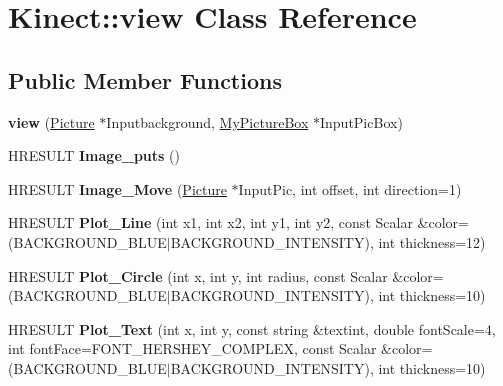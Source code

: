 \hypertarget{class_kinect_1_1view}{}\section{Kinect\+:\+:view Class Reference}
\label{class_kinect_1_1view}
\subsection*{Public Member Functions}
\begin{DoxyCompactItemize}
\item 
\mbox{\label{class_kinect_1_1view_a7ebf6fadb413105fa01bcead12b0359b}} 
{\bfseries view} (\hyperlink{class_kinect_1_1_picture}{Picture} $\ast$Inputbackground, \hyperlink{class_kinect_1_1_my_picture_box}{My\+Picture\+Box} $\ast$Input\+Pic\+Box)
\item 
\mbox{\label{class_kinect_1_1view_ac92e473babcc53663eff1f24bc9aa220}} 
H\+R\+E\+S\+U\+LT {\bfseries Image\+\_\+puts} ()
\item 
\mbox{\label{class_kinect_1_1view_aad987f15fb3002d68f8ff03bb84b119a}} 
H\+R\+E\+S\+U\+LT {\bfseries Image\+\_\+\+Move} (\hyperlink{class_kinect_1_1_picture}{Picture} $\ast$Input\+Pic, int offset, int direction=1)
\item 
\mbox{\label{class_kinect_1_1view_a60be597e91bc28f18d1806beb2edba81}} 
H\+R\+E\+S\+U\+LT {\bfseries Plot\+\_\+\+Line} (int x1, int x2, int y1, int y2, const Scalar \&color=(B\+A\+C\+K\+G\+R\+O\+U\+N\+D\+\_\+\+B\+L\+UE$\vert$B\+A\+C\+K\+G\+R\+O\+U\+N\+D\+\_\+\+I\+N\+T\+E\+N\+S\+I\+TY), int thickness=12)
\item 
\mbox{\label{class_kinect_1_1view_afef3fd27b92b0de9152aa3f2372c4e0f}} 
H\+R\+E\+S\+U\+LT {\bfseries Plot\+\_\+\+Circle} (int x, int y, int radius, const Scalar \&color=(B\+A\+C\+K\+G\+R\+O\+U\+N\+D\+\_\+\+B\+L\+UE$\vert$B\+A\+C\+K\+G\+R\+O\+U\+N\+D\+\_\+\+I\+N\+T\+E\+N\+S\+I\+TY), int thickness=10)
\item 
\mbox{\label{class_kinect_1_1view_a229f26d91052340bb714fdc3bfed54d0}} 
H\+R\+E\+S\+U\+LT {\bfseries Plot\+\_\+\+Text} (int x, int y, const string \&textint, double font\+Scale=4, int font\+Face=F\+O\+N\+T\+\_\+\+H\+E\+R\+S\+H\+E\+Y\+\_\+\+C\+O\+M\+P\+L\+EX, const Scalar \&color=(B\+A\+C\+K\+G\+R\+O\+U\+N\+D\+\_\+\+B\+L\+UE$\vert$B\+A\+C\+K\+G\+R\+O\+U\+N\+D\+\_\+\+I\+N\+T\+E\+N\+S\+I\+TY), int thickness=10)

\end{DoxyCompactItemize}
